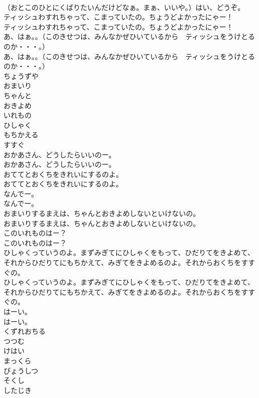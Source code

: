 \documentclass[8pt]{extreport}
\begin{document}
\begin{CJK}{UTF8}{min}
\\	（おとこのひとにくばりたいんだけどなぁ。まぁ、いいや。）はい、どうぞ。 
\\	ティッシュわすれちゃって、こまっていたの。ちょうどよかったにゃー！	
\\	ティッシュわすれちゃって、こまっていたの。ちょうどよかったにゃー！ 
\\	あ、はぁ。。（このきせつは、みんなかぜひいているから　ティッシュをうけとるのか・・・。）	
\\	あ、はぁ。。（このきせつは、みんなかぜひいているから　ティッシュをうけとるのか・・・。） 
\\	ちょうずや
\\	おまいり
\\	ちゃんと
\\	おきよめ
\\	いれもの
\\	ひしゃく
\\	もちかえる
\\	すすぐ
\\	おかあさん、どうしたらいいのー。	
\\	おかあさん、どうしたらいいのー。 
\\	おててとおくちをきれいにするのよ。	
\\	おててとおくちをきれいにするのよ。 
\\	なんでー。	
\\	なんでー。 
\\	おまいりするまえは、ちゃんとおきよめしないといけないの。	
\\	おまいりするまえは、ちゃんとおきよめしないといけないの。 
\\	このいれものはー？	
\\	このいれものはー？ 
\\	ひしゃくっていうのよ。まずみぎてにひしゃくをもって、ひだりてをきよめて、それからひだりてにもちかえて、みぎてをきよめるのよ。それからおくちをすすぐの。	
\\	ひしゃくっていうのよ。まずみぎてにひしゃくをもって、ひだりてをきよめて、それからひだりてにもちかえて、みぎてをきよめるのよ。それからおくちをすすぐの。 
\\	はーい。	
\\	はーい。 
\\	くずれおちる
\\	つつむ
\\	けはい
\\	まっくら
\\	びょうしつ
\\	そくし
\\	したじき

\end{CJK}
\end{document}
